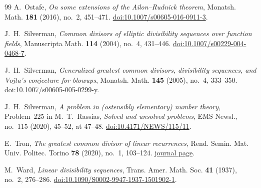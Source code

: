 \documentclass[11pt]{amsart}
\theoremstyle{remark}
\numberwithin{equation}{section}
\begin{document}
\begin{thebibliography}{99}
A.~Ostafe,
\emph{On some extensions of the Ailon--Rudnick theorem},
Monatsh. Math. \textbf{181} (2016), no.~2, 451--471.
\href{https://doi.org/10.1007/s00605-016-0911-3}{doi:10.1007/s00605-016-0911-3}.

J.~H.~Silverman,
\emph{Common divisors of elliptic divisibility sequences over function fields},
Manuscripta Math. \textbf{114} (2004), no.~4, 431--446.
\href{https://doi.org/10.1007/s00229-004-0468-7}{doi:10.1007/s00229-004-0468-7}.

J.~H.~Silverman,
\emph{Generalized greatest common divisors, divisibility sequences, and Vojta's conjecture for blowups},
Monatsh. Math. \textbf{145} (2005), no.~4, 333--350.
\href{https://doi.org/10.1007/s00605-005-0299-y}{doi:10.1007/s00605-005-0299-y}.

J.~H.~Silverman,
\emph{A problem in (ostensibly elementary) number theory},
Problem~225 in M.~T.~Rassias, \emph{Solved and unsolved problems},
EMS Newsl., no.~115 (2020), 45--52, at 47--48.
\href{https://doi.org/10.4171/NEWS/115/11}{doi:10.4171/NEWS/115/11}.

E.~Tron,
\emph{The greatest common divisor of linear recurrences},
Rend. Semin. Mat. Univ. Politec. Torino \textbf{78} (2020), no.~1, 103--124.
\href{https://seminariomatematico.polito.it/rendiconti/78-1.html}{journal page}.

M.~Ward,
\emph{Linear divisibility sequences},
Trans. Amer. Math. Soc. \textbf{41} (1937), no.~2, 276--286.
\href{https://doi.org/10.1090/S0002-9947-1937-1501902-1}{doi:10.1090/S0002-9947-1937-1501902-1}.

\end{thebibliography}
\end{document}
